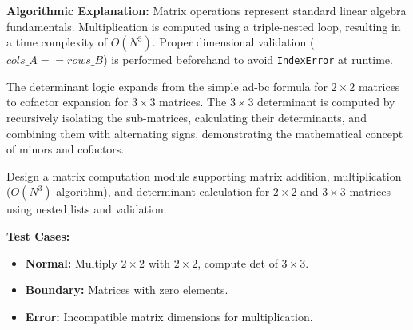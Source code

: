 \textbf{Algorithmic Explanation:}
Matrix operations represent standard linear algebra fundamentals. Multiplication is computed using a triple-nested loop, resulting in a time complexity of $O(N^3)$. Proper dimensional validation ($cols\_A == rows\_B$) is performed beforehand to avoid \texttt{IndexError} at runtime.

The determinant logic expands from the simple ad-bc formula for $2 \times 2$ matrices to cofactor expansion for $3 \times 3$ matrices. The $3 \times 3$ determinant is computed by recursively isolating the sub-matrices, calculating their determinants, and combining them with alternating signs, demonstrating the mathematical concept of minors and cofactors.

\begin{practiceset}
Design a matrix computation module supporting matrix addition, multiplication ($O(N^3)$ algorithm), and determinant calculation for $2 \times 2$ and $3 \times 3$ matrices using nested lists and validation.

\textbf{Test Cases:}
\begin{itemize}
    \item \textbf{Normal:} Multiply $2 \times 2$ with $2 \times 2$, compute det of $3 \times 3$.
    \item \textbf{Boundary:} Matrices with zero elements.
    \item \textbf{Error:} Incompatible matrix dimensions for multiplication.
\end{itemize}
\end{practiceset}

